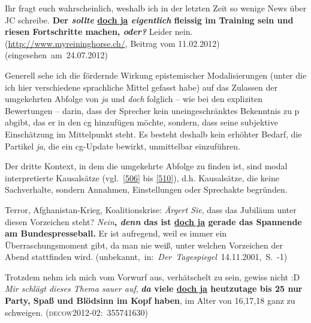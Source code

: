 \begin{exe}
	\ex\label{505} 

	Ihr fragt euch wahrscheinlich, weshalb ich in der letzten Zeit so wenige News über JC schreibe. \textbf{Der \textit{sollte} \underline{doch ja} 			\textit{eigentlich} fleissig im Training sein und riesen Fortschritte machen, \textit{\textbf{oder}?}} Leider nein.\newline
	{\scriptsize(\url{http://www.myreininghorse.ch/}, Beitrag vom 11.02.2012)}\hfill\hbox{(eingesehen am 24.07.2012)}
	\newline
	\hbox{}\hfill\hbox{\citet[176]{Mueller2014a}}
\end{exe}        	        
Generell sehe ich die fördernde Wirkung epistemischer Modalisierungen (unter die ich hier verschiedene sprachliche Mittel gefasst habe) auf das Zulassen der umgekehrten Abfolge von \textit{ja} und \textit{doch} folglich – wie bei den expliziten Bewertungen – darin, dass der Sprecher kein uneingeschränktes Bekenntnis zu p abgibt, das er in den cg hinzufügen möchte, sondern, dass seine subjektive Einschätzung  im Mittelpunkt steht. Es besteht deshalb kein erhöhter Bedarf, die Partikel \textit{ja}, die ein cg-Update bewirkt, unmittelbar einzuführen.		
	
Der dritte Kontext, in dem die umgekehrte Abfolge zu finden ist, sind  modal interpretierte Kausalsätze (vgl.\ \ref{506} bis \ref{510}), d.h. Kausalsätze, die keine Sachverhalte, sondern Annahmen, Einstellungen oder Sprechakte begründen.

\begin{exe}
	\ex\label{506} 

	Terror, Afghanistan-Krieg, Koalitionskrise: \emph{Ärgert Sie}, dass das Jubiläum unter diesen Vorzeichen steht? \emph{Nein}\textbf{, \textit{denn} das ist \underline{doch ja} gerade das Spannende am Bundespresseball.} Er ist aufregend, weil es immer ein Überraschungsmoment gibt, da man nie weiß, unter welchen Vorzeichen der Abend stattfinden wird.	 		 
	\newline\hbox{}\hfill\hbox{(unbekannt, in: \textit{Der Tagespiegel} 14.11.2001, S. -1)}	
\end{exe}

\begin{exe}
	\ex\label{507} 

	Trotzdem nehm ich mich vom Vorwurf aus, verhätschelt zu sein, gewiss nicht :D \emph{Mir schlägt dieses Thema sauer auf}, \textbf{\textit{da} viele \underline{doch ja} heutzutage bis 25 nur Party, Spaß und Blödsinn im Kopf haben}, im Alter von 16,17,18 ganz zu schweigen.  		 
	\hfill\hbox{\scshape(decow2012-02: 355741630)}	
\end{exe}			 

